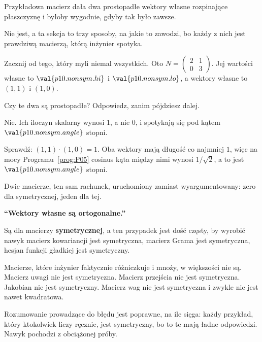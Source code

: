 \begin{fr}
Przykładowa macierz dała dwa prostopadłe wektory własne rozpinające płaszczyznę
i byłoby wygodnie, gdyby tak było zawsze.

Nie jest, a ta sekcja to trzy sposoby, na jakie to zawodzi, bo każdy z nich jest
prawdziwą macierzą, którą inżynier spotyka.

Zacznij od tego, który myli niemal wszystkich. Oto
$N = \begin{pmatrix} 2 & 1 \\ 0 & 3 \end{pmatrix}$. Jej wartości własne to
$\val{p10.nonsym.hi}$ i $\val{p10.nonsym.lo}$, a wektory własne to $(1, 1)$ i
$(1, 0)$.

Czy te dwa są prostopadłe? Odpowiedz, zanim pójdziesz dalej.
\dotline
\nextframe
\end{fr}

\begin{fr}
\begin{ansblock}
Nie. Ich iloczyn skalarny wynosi $1$, a nie $0$, i spotykają się pod kątem
$\val{p10.nonsym.angle}$ stopni.
\end{ansblock}

Sprawdź: $(1,1) \cdot (1,0) = 1$. Oba wektory mają długość co najmniej $1$, więc
na mocy Programu~\ref{prog:P05} cosinus kąta między nimi wynosi $1/\sqrt{2}$, a
to jest $\val{p10.nonsym.angle}$ stopni.


Dwie macierze, ten sam rachunek, uruchomiony zamiast wyargumentowany: zero dla
symetrycznej, jeden dla tej.
\end{fr}

\begin{trapbox}
\textbf{\enquote{Wektory własne są ortogonalne.}}

Są dla macierzy \textbf{symetrycznej}, a ten przypadek jest dość częsty, by
wyrobić nawyk \dash{} macierz kowariancji jest symetryczna, macierz Grama jest
symetryczna, hesjan funkcji gładkiej jest symetryczny.

Macierze, które inżynier faktycznie różniczkuje i mnoży, w większości nie są.
Macierz uwagi nie jest symetryczna. Macierz przejścia nie jest symetryczna.
Jakobian nie jest symetryczny. Macierz wag nie jest symetryczna i zwykle nie
jest nawet kwadratowa.

Rozumowanie prowadzące do błędu jest poprawne, na ile sięga: każdy przykład,
który ktokolwiek liczy ręcznie, jest symetryczny, bo to te mają ładne
odpowiedzi. Nawyk pochodzi z obciążonej próby.
\end{trapbox}

